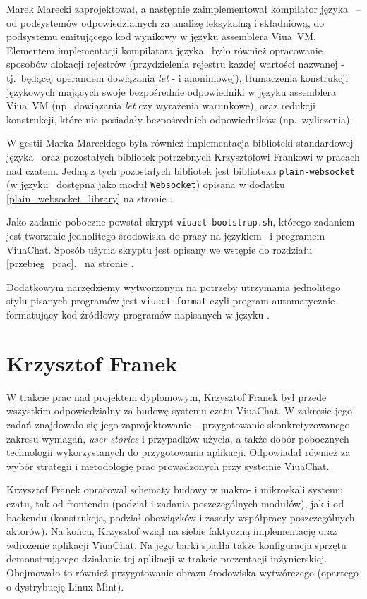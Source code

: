 Marek Marecki zaprojektował, a następnie zaimplementował kompilator języka
\ViuAct\ -- od podsystemów odpowiedzialnych za analizę leksykalną i składniową,
do podsystemu emitującego kod wynikowy w języku assemblera Viua~VM. Elementem
implementacji kompilatora języka \ViuAct\ było również opracowanie sposobów
alokacji rejestrów (przydzielenia rejestru każdej wartości nazwanej -
tj.~będącej operandem dowiązania \emph{let} - i anonimowej), tłumaczenia
konstrukcji językowych mających swoje bezpośrednie odpowiedniki w języku
assemblera Viua~VM (np.~dowiązania \emph{let} czy wyrażenia warunkowe), oraz
redukcji konstrukcji, które nie posiadały bezpośrednich odpowiedników
(np.~wyliczenia).

W gestii Marka Mareckiego była również implementacja biblioteki standardowej
języka \ViuAct\ oraz pozostałych bibliotek potrzebnych Krzysztofowi Frankowi w
pracach nad czatem. Jedną z tych pozostałych bibliotek jest biblioteka
\texttt{plain-websocket} (w języku \ViuAct\ dostępna jako moduł
\texttt{Websocket}) opisana w dodatku \ref{plain_websocket_library} na stronie
\pageref{plain_websocket_library}.

Jako zadanie poboczne powstał skrypt \texttt{viuact-bootstrap.sh}, którego
zadaniem jest tworzenie jednolitego środowiska do pracy na językiem \ViuAct\ i
programem ViuaChat. Sposób użycia skryptu jest opisany we wstępie do rozdziału
\ref{przebieg_prac}.~ na stronie \pageref{przebieg_prac}.

Dodatkowym narzędziemy wytworzonym na potrzeby utrzymania jednolitego stylu
pisanych programów jest \texttt{viuact-format} czyli program automatycznie
formatujący kod źródłowy programów napisanych w języku \ViuAct.

\section{Krzysztof Franek}

W trakcie prac nad projektem dyplomowym, Krzysztof Franek był przede wszystkim
odpowiedzialny za budowę systemu czatu ViuaChat. W zakresie jego zadań znajdowało
się jego zaprojektowanie -- przygotowanie skonkretyzowanego zakresu wymagań,
\textit{user stories} i przypadków użycia, a także dobór pobocznych technologii
wykorzystanych do przygotowania aplikacji. Odpowiadał również za wybór strategii
i metodologię prac prowadzonych przy systemie ViuaChat.

Krzysztof Franek opracował schematy budowy w makro- i mikroskali
systemu czatu, tak od frontendu (podział
i zadania poszczególnych modułów), jak i od backendu (konstrukcja, podział obowiązków
i zasady współpracy poszczególnych aktorów). Na końcu, Krzysztof wziął na siebie
faktyczną implementację oraz wdrożenie aplikacji ViuaChat. Na jego barki spadła
także konfiguracja sprzętu demonstrującego działanie tej aplikacji w trakcie
prezentacji inżynierskiej. Obejmowało to również przygotowanie obrazu środowiska
wytwórczego (opartego o dystrybucję Linux Mint).

